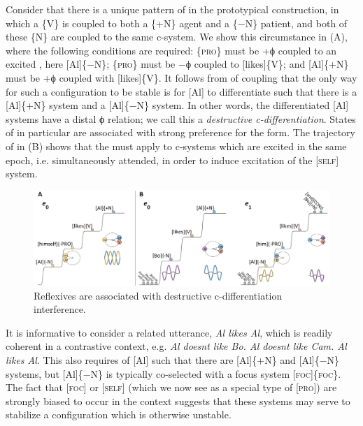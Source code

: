   Consider that there is a unique pattern of  in the prototypical  construction, in which a \{V\} is coupled to both a \{+N\} agent and a \{−N\} patient, and both of these \{N\} are coupled to the same c-system. We show this circumstance in {}(A), where the following conditions are required: \{\textsc{pro}\} must be +ϕ coupled to an excited , here [Al]\{−N\}; \{\textsc{pro}\} must be −ϕ coupled to [likes]\{V\}; and [Al]\{+N\} must be +ϕ coupled with [likes]\{V\}. It follows from  of coupling that the only way for such a configuration to be stable is for [Al] to differentiate such that there is a [Al]\{+N\} system and a [Al]\{−N\} system. In other words, the differentiated [Al] systems have a distal ϕ relation; we call this a \textit{destructive c-dif\-fer\-en\-ti\-a\-tion}. States of  in particular are associated with strong preference for the  form. The trajectory of  in {}(B) shows that the  must apply to c-systems which are excited in the same epoch, i.e. simultaneously attended, in order to induce excitation of the [\textsc{self}] system. 

\ea\label{ex:7:15}
 \label{ex:7:15a} 
  \label{ex:7:15b}
\z
\z
  
\begin{figure}
\includegraphics[width=\textwidth]{figures/Tilsen-img156.png}
\caption{Reflexives are associated with destructive c-dif\-fer\-en\-ti\-a\-tion interference.}
\label{fig:7:12}
\end{figure}
 

  It is informative to consider a related utterance, \textit{Al likes Al}, which is readily coherent in a contrastive context, e.g. \textit{Al doesnt like Bo. Al doesnt like Cam. Al likes Al}. This also requires  of [Al] such that there are [Al]\{+N\} and [Al]\{−N\} systems, but [Al]\{−N\} is typically co-selected with a focus system [\textsc{foc}]\{\textsc{foc}\}. The fact that [\textsc{foc}] or [\textsc{self}] (which we now see as a special type of [\textsc{pro}]) are strongly biased to occur in the  context suggests that these systems may serve to stabilize a configuration which is otherwise unstable.

